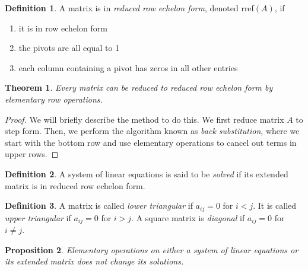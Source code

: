 \documentclass{article}
\newtheorem{theorem}{Theorem}[section]
\newtheorem{proposition}[theorem]{Proposition}
\theoremstyle{remark}
\theoremstyle{definition}
\newtheorem{definition}{Definition}[section]
\begin{document}
    \begin{definition}
    A matrix is in \textit{reduced row echelon form}, denoted rref$(A)$, if
    \begin{enumerate}
        \item it is in row echelon form
        \item the pivots are all equal to 1
        \item each column containing a pivot has zeros in all other entries
    \end{enumerate}
    \end{definition}

    \begin{theorem}
    Every matrix can be reduced to reduced row echelon form by elementary row operations. 
    \end{theorem}

    \begin{proof}
    We will briefly describe the method to do this. We first reduce matrix $A$ to step form. Then, we perform the algorithm known as \textit{back substitution}, where we start with the bottom row and use elementary operations to cancel out terms in upper rows. 
    \end{proof}

    \begin{definition}
    A system of linear equations is said to be \textit{solved} if its extended matrix is in reduced row echelon form. 
    \end{definition}

    \begin{definition}
    A matrix is called \textit{lower triangular} if $a_{i j} = 0$ for $i < j$. It is called \textit{upper triangular} if $a_{i j} = 0$ for $i > j$. A square matrix is \textit{diagonal} if $a_{i j} = 0$ for $i \neq j$. 
    \end{definition}

    \begin{proposition}
    Elementary operations on either a system of linear equations or its extended matrix does not change its solutions. 
    \end{proposition}
\end{document}
